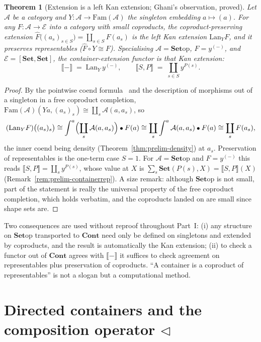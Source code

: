 \documentclass[11pt]{report}
\theoremstyle{plain}
\newtheorem{theorem}{Theorem}[chapter]
\theoremstyle{definition}
\theoremstyle{remark}
\newcommand{\Cont}{\mathbf{Cont}}
\newcommand{\Fam}{\mathrm{Fam}}
\newcommand{\tri}{\triangleleft}
\newcommand{\op}{\mathrm{op}}
\newcommand{\Set}{\mathbf{Set}}
\newcommand{\den}[1]{\llbracket #1 \rrbracket}
\newcommand{\yy}{y^{(-)}}
\newcommand{\Lan}{\mathrm{Lan}}
\newcommand{\co}{\mathbin{\text{\small$\bullet$}}}
\newcommand{\iso}{\cong}
\begin{document}
\begin{theorem}[Extension is a left Kan extension; Ghani's observation, proved]
\label{thm:prelim-lan}
Let $\mathcal A$ be a category and $Y\colon\mathcal A\to\Fam(\mathcal A)$ the
singleton embedding $a\mapsto(a)$. For any $F\colon\mathcal A\to\mathcal E$ into a
category with small coproducts, the coproduct-preserving extension
$\widehat F\bigl((a_s)_{s\in S}\bigr)=\coprod_{s\in S}F(a_s)$ is the left Kan
extension $\Lan_Y F$, and it preserves representables ($\widehat F\circ Y\iso F$).
Specialising $\mathcal A=\Set\op$, $F=\yy$, and $\mathcal E=[\Set,\Set]$, the
container-extension functor is that Kan extension:
\[
  \den{-}\;=\;\Lan_Y\,\yy,\qquad \den{S,P}\;=\;\coprod_{s\in S}y^{P(s)}.
\]
\end{theorem}

\begin{proof}
By the pointwise coend formula~\cite[Ch.~X]{maclane} and the description of
morphisms out of a singleton in a free coproduct completion,
$\Fam(\mathcal A)(Ya,(a_s)_s)\iso\coprod_{s}\mathcal A(a,a_s)$, so
\[
  (\Lan_Y F)\bigl((a_s)_s\bigr)
  \iso\int^{a}\Bigl(\coprod_s\mathcal A(a,a_s)\Bigr)\co F(a)
  \iso\coprod_s\int^{a}\mathcal A(a,a_s)\co F(a)
  \iso\coprod_s F(a_s),
\]
the inner coend being density (Theorem~\ref{thm:prelim-density}) at $a_s$.
Preservation of representables is the one-term case $S=1$. For
$\mathcal A=\Set\op$ and $F=\yy$ this reads
$\den{S,P}=\coprod_s y^{P(s)}$, whose value at $X$ is
$\sum_s\Set(P(s),X)=\den{S,P}(X)$ (Remark~\ref{rem:prelim-containerrep}). A size
remark: although $\Set\op$ is not small, part of the statement is really the
universal property of the free coproduct completion, which holds verbatim, and the
coproducts landed on are small since shape sets are.
\end{proof}

Two consequences are used without reproof throughout Part~I: (i) any structure on
$\Set\op$ transported to $\Cont$ need only be defined on singletons and extended
by coproducts, and the result is automatically the Kan extension; (ii) to check a
functor out of $\Cont$ agrees with $\den{-}$ it suffices to check agreement on
representables plus preservation of coproducts. ``A container is a coproduct of
representables'' is not a slogan but a computational method.

\section{Directed containers and the composition operator \texorpdfstring{$\tri$}{<|}}
\label{sec:prelim-dcont}
\end{document}
